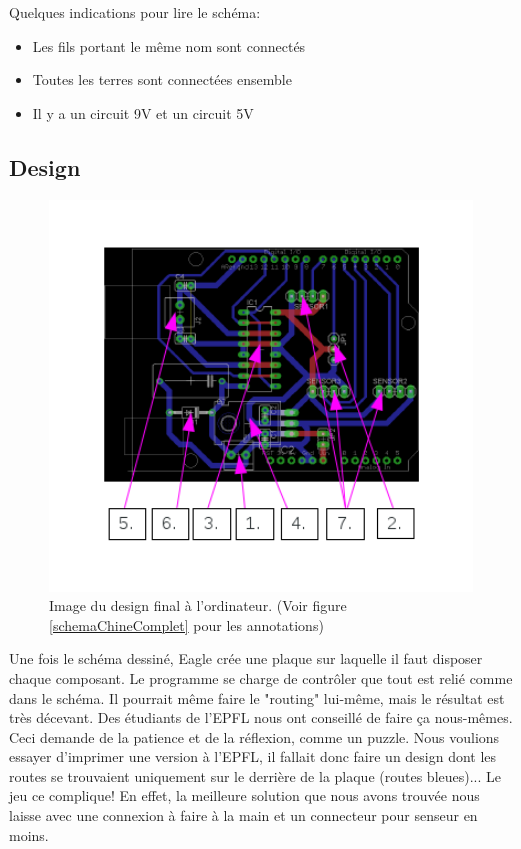 \documentclass[a4paper,11pt]{report}
\begin{document}
{Quelques indications pour lire le schéma:

\begin{itemize}
\item Les fils portant le même nom sont connectés
\item Toutes les terres sont connectées ensemble
\item Il y a un circuit 9V et un circuit 5V
\end{itemize}

\subsection{Design}
\begin{figure}[h]
\centering
\includegraphics[width=1\textwidth]{figures/board_CHI_annotated.png}
\caption[Design final du PCB]{\label{BoardChine}Image du design final à
  l'ordinateur. (Voir figure \ref{schemaChineComplet} pour les annotations)
}
\end{figure}

Une fois le schéma dessiné, Eagle crée une plaque sur laquelle il faut disposer chaque composant. Le programme se charge de contrôler que tout est relié comme dans le schéma. Il pourrait même faire le "routing" lui-même, mais le résultat est très décevant. Des étudiants de l'EPFL nous ont conseillé de faire ça nous-mêmes. Ceci demande de la patience et de la réflexion, comme un puzzle. Nous voulions essayer d'imprimer une version à l'EPFL, il fallait donc faire un design dont les routes se trouvaient uniquement sur le derrière de la plaque (routes bleues)... Le jeu ce complique! En effet, la meilleure solution que nous avons trouvée nous laisse avec une connexion à faire à la main et un connecteur pour senseur en moins.

}
\end{document}
